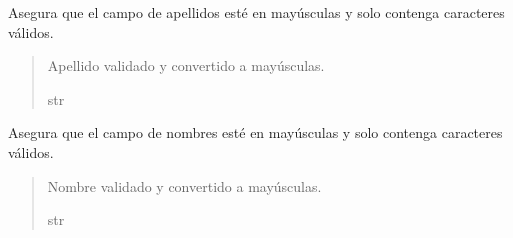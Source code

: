 \documentclass[letterpaper,10pt,spanish]{sphinxmanual}
\begin{document}
\begin{fulllineitems}
\begin{fulllineitems}

\pysigstartsignatures
{}
\pysigstopsignatures
\sphinxAtStartPar
Asegura que el campo de apellidos esté en mayúsculas y solo contenga caracteres válidos.
\begin{quote}\begin{description}
\sphinxAtStartPar
Apellido validado y convertido a mayúsculas.

\sphinxAtStartPar
str

\end{description}\end{quote}

\end{fulllineitems}



\begin{fulllineitems}

\pysigstartsignatures
{}
\pysigstopsignatures
\sphinxAtStartPar
Asegura que el campo de nombres esté en mayúsculas y solo contenga caracteres válidos.
\begin{quote}\begin{description}
\sphinxAtStartPar
Nombre validado y convertido a mayúsculas.

\sphinxAtStartPar
str

\end{description}\end{quote}

\end{fulllineitems}



\begin{fulllineitems}


\end{fulllineitems}
\end{fulllineitems}
\end{document}
